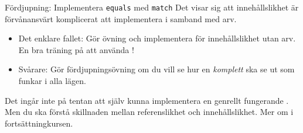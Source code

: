 

\ifkompendium\else
{}
\begin{Slide}{Fördjupning: Implementera \texttt{equals} med \texttt{match}}
Det visar sig att innehållslikhet är förvånansvärt komplicerat att implementera i samband med arv.
\begin{itemize}
\item Det enklare fallet: Gör övning  och implementera  för innehållslikhet utan arv. \\ En bra träning på att använda !

\item Svårare: Gör fördjupningsövning  om du vill se hur en \emph{komplett}  ska se ut som funkar i alla lägen.

\end{itemize}

Det ingår inte på tentan att själv kunna implementera en genrellt fungerande . Men du ska förstå skillnaden mellan referenslikhet och innehållslikhet. Mer om  i fortsättningkursen.
\end{Slide}
\fi











